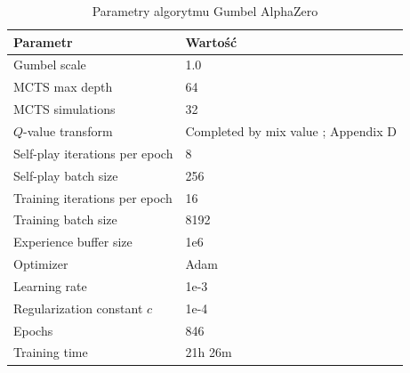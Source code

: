 \begin{table}
    \centering
    \caption{Parametry algorytmu Gumbel AlphaZero}
    \label{tab:gumbel-alphazero-params}
    \begin{tabular}{ll}
        \toprule
        Parametr & Wartość \\ \midrule
        Gumbel scale \cite{GumbelAZ} & 1.0 \\
        MCTS max depth & 64 \\
        MCTS simulations & 32 \\
        $Q$-value transform & Completed by mix value \cite{GumbelAZ}; Appendix D \\
        Self-play iterations per epoch & 8 \\
        Self-play batch size & 256 \\
        Training iterations per epoch & 16 \\
        Training batch size & 8192 \\
        Experience buffer size & 1e6 \\
        Optimizer & Adam \cite{Adam} \\
        Learning rate & 1e-3 \\
        Regularization constant $c$ & 1e-4 \\
        Epochs & 846 \\
        Training time & 21h 26m \\
        \bottomrule
    \end{tabular}
\end{table}


